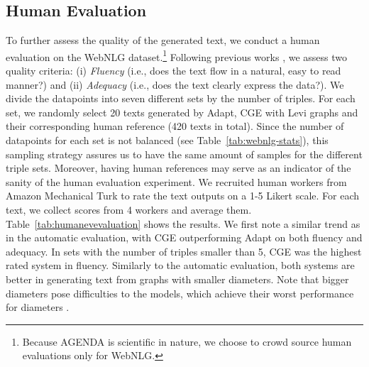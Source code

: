 \documentclass[11pt,a4paper]{article}
\begin{document}
\subsection{Human Evaluation}
\label{sec:humaneval}
To further assess the quality of the generated text, we conduct a human evaluation on the WebNLG dataset.\footnote{Because AGENDA is scientific in nature, we choose to crowd source human evaluations only for WebNLG.} Following previous works \cite{gardent-etal-2017-webnlg, castro-ferreira-etal-2019-neural}, we assess two quality criteria: (i) \emph{Fluency} (i.e., does the text flow in a natural, easy to read manner?) and (ii) \emph{Adequacy} (i.e., does the text clearly express the data?). We divide the datapoints into seven different sets by the number of triples. For each set, we randomly select 20 texts generated by Adapt, {\selectfont CGE} with Levi graphs and their corresponding human reference (420 texts in total). Since the number of datapoints for each set is not balanced (see Table~\ref{tab:webnlg-stats}), this sampling strategy assures us to have the same amount of samples for the different triple sets. Moreover, having human references may serve as an indicator of the sanity of the human evaluation experiment. We recruited human workers from Amazon Mechanical Turk to rate the text outputs on a 1-5 Likert scale. For each text, we collect scores from 4 workers and average them. Table~\ref{tab:humanevevaluation} shows the results. We first note a similar trend as in the automatic evaluation, with {\selectfont CGE} outperforming Adapt on both fluency and adequacy. In sets with the number of triples smaller than 5, {\selectfont CGE} was the highest rated system in fluency. Similarly to the automatic evaluation, both systems are better in generating text from graphs with smaller diameters. Note that bigger diameters pose difficulties to the models, which achieve their worst performance for diameters .
\end{document}
